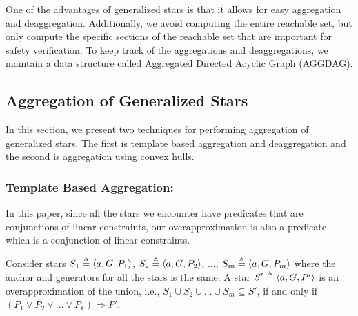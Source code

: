 One of the advantages of generalized stars is that it allows for easy aggregation and deaggregation. 
%
Additionally, we avoid computing the entire reachable set, but only compute the specific sections of the reachable set that are important for safety verification.
%
%
To keep track of the aggregations and deaggregations, we maintain a data structure called Aggregated Directed Acyclic Graph (AGGDAG).
%




\subsection{Aggregation of Generalized Stars}
\label{sec:aggStars}

In this section, we present two techniques for performing aggregation of generalized stars. The first is template based aggregation and deaggregation and the second is aggregation using convex hulls.
%


\subsubsection{Template Based Aggregation:}
\label{sec:templateAgg}
In this paper, since all the stars we encounter have predicates that are conjunctions of linear constraints, our overapproximation is also a predicate which is a conjunction of linear constraints. 

\begin{lemma}
\label{lem:agg}
Consider stars $S_1 \deq \tup{a, G, P_1}$, $S_2 \deq \tup{a, G, P_2}$, $\ldots$, $S_m \deq \tup{a, G, P_m}$ where the anchor and generators for all the stars is the same.
%
A star $S' \deq \tup{a, G, P'}$ is an overapproximation of the union, i.e., $S_1 \cup S_2 \cup \ldots \cup S_m \subseteq S'$, if and only if $(P_1 \vee P_2 \vee \ldots \vee P_k) \Rightarrow P'$.
\end{lemma}

